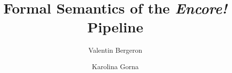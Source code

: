 \documentclass{llncs}
\newcommand{\encore}{\textit{Encore!}}
\begin{document}
\title{Formal Semantics of the \encore{} Pipeline}
\author{Valentin Bergeron \and Karolina Gorna}
\maketitle



\end{document}
